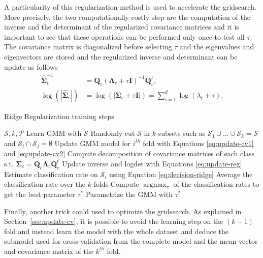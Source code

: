 \documentclass[a4paper,11pt,DIV=16]{scrartcl}
\begin{document}
    A particularity of this regularization method is used to accelerate the gridsearch. More precisely, the two computationally costly step are the computation of the inverse and the determinant of the regularized covariance matrices and it is important to see that these operations can be performed only once to test all $\tau$. The covariance matrix is diagonalized before selecting $\tau$ and the eigenvalues and eigenvectors are stored and the regularized inverse and determinant can be update as follows
    \begin{align}
        \hat{\boldsymbol{\Sigma}}_c^{-1} &= \mathbf{Q}_c (\boldsymbol{\Lambda}_c + \tau \mathbf{I})^{-1} \mathbf{Q}_c^t, \nonumber\\
        \log (|\hat{\boldsymbol{\Sigma}}_c|) &= \log (|\boldsymbol{\Sigma}_c + \tau \mathbf{I}|) = \sum_{i=1}^{d} \log (\lambda_i + \tau).
        \label{eq:update-reg}
    \end{align}

    \begin{algorithm}
    \caption{Ridge Regularization training steps\label{alg:ridge}}
    \begin{algorithmic}[1]
    \REQUIRE $\mathcal{S},k,\mathcal{P}$
    \STATE Learn GMM with $\mathcal{S}$
    \STATE Randomly cut $\mathcal{S}$ in $k$ subsets such as $\mathcal{S}_1 \cup \text{...} \cup \mathcal{S}_k = \mathcal{S}$ and $\mathcal{S}_i \cap \mathcal{S}_j = \emptyset$
    \STATE Update GMM model for $i^{th}$ fold with Equations \ref{eq:update-cv1} and \ref{eq:update-cv2}
    \STATE Compute decomposition of covariance matrices of each class s.t. $\boldsymbol{\Sigma}_c = \mathbf{Q}_c \boldsymbol{\Lambda}_c \mathbf{Q}_c^t$
    \STATE Update inverse and logdet with Equations \ref{eq:update-reg}
    \STATE Estimate classification rate on $\mathcal{S}_i$ using Equation \ref{eq:decision-ridge}
    \ENDFOR
    \ENDFOR
    \STATE Average the classification rate over the $k$ folds
    \STATE Compute $\text{arg} \max_{\tau}$ of the classification rates to get the best parameter $\tau^*$
    \STATE Parametrize the GMM with $\tau^*$
    \end{algorithmic}
    \end{algorithm}

    Finally, another trick could used to optimize the gridsearch. As explained in Section~\ref{sec:update-cv}, it is possible to avoid the learning step on the $(k-1)$ fold and instead learn the model with the whole dataset and deduce the submodel used for cross-validation from the complete model and the mean vector and covariance matrix of the $k^{th}$ fold.
\end{document}
